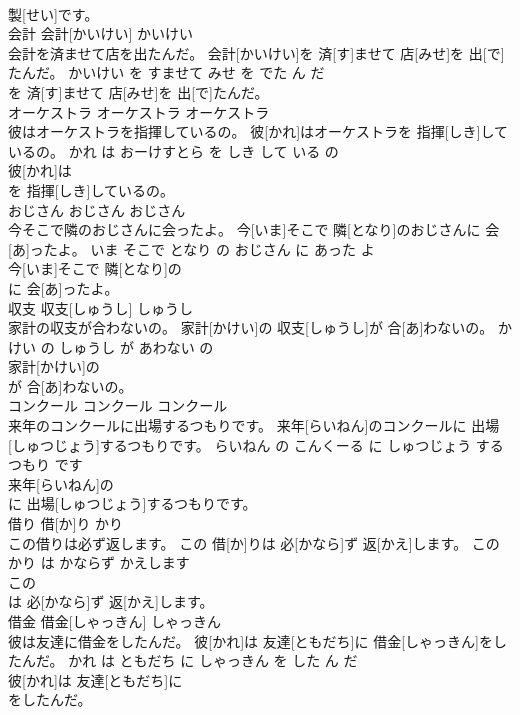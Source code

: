 \documentclass[8pt]{extreport}
\begin{document}
\begin{CJK}{UTF8}{min}
\\	製[せい]です。			
\\	会計	会計[かいけい]	かいけい	
\\	会計を済ませて店を出たんだ。	会計[かいけい]を 済[す]ませて 店[みせ]を 出[で]たんだ。	かいけい を すませて みせ を でた ん だ	
\\	を 済[す]ませて 店[みせ]を 出[で]たんだ。			
\\	オーケストラ	オーケストラ	オーケストラ	
\\	彼はオーケストラを指揮しているの。	彼[かれ]はオーケストラを 指揮[しき]しているの。	かれ は おーけすとら を しき して いる の	
\\	彼[かれ]は
\\	を 指揮[しき]しているの。			
\\	おじさん	おじさん	おじさん	
\\	今そこで隣のおじさんに会ったよ。	今[いま]そこで 隣[となり]のおじさんに 会[あ]ったよ。	いま そこで となり の おじさん に あった よ	
\\	今[いま]そこで 隣[となり]の
\\	に 会[あ]ったよ。			
\\	収支	収支[しゅうし]	しゅうし	
\\	家計の収支が合わないの。	家計[かけい]の 収支[しゅうし]が 合[あ]わないの。	かけい の しゅうし が あわない の	
\\	家計[かけい]の
\\	が 合[あ]わないの。			
\\	コンクール	コンクール	コンクール	
\\	来年のコンクールに出場するつもりです。	来年[らいねん]のコンクールに 出場[しゅつじょう]するつもりです。	らいねん の こんくーる に しゅつじょう する つもり です	
\\	来年[らいねん]の
\\	に 出場[しゅつじょう]するつもりです。			
\\	借り	借[か]り	かり	
\\	この借りは必ず返します。	この 借[か]りは 必[かなら]ず 返[かえ]します。	この かり は かならず かえします	
\\	この
\\	は 必[かなら]ず 返[かえ]します。			
\\	借金	借金[しゃっきん]	しゃっきん	
\\	彼は友達に借金をしたんだ。	彼[かれ]は 友達[ともだち]に 借金[しゃっきん]をしたんだ。	かれ は ともだち に しゃっきん を した ん だ	
\\	彼[かれ]は 友達[ともだち]に
\\	をしたんだ。			

\end{CJK}
\end{document}
